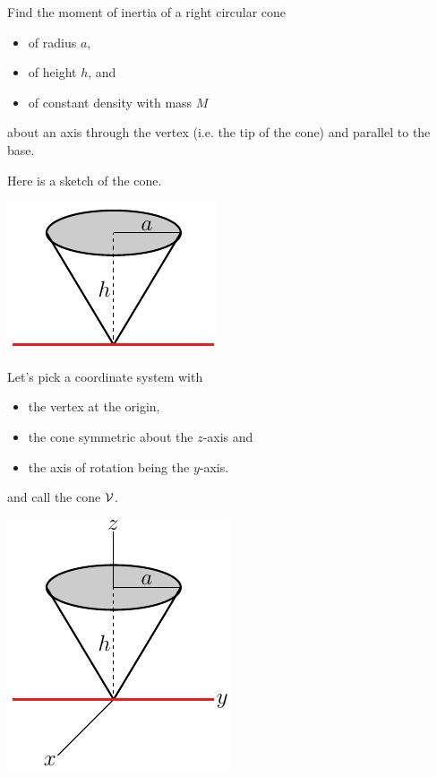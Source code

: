 \begin{eg}\label{eg moment cone}
Find the moment of inertia of a right circular cone 
\begin{itemize}\itemsep1pt \parskip0pt 
\item 
of radius $a$,
\item 
of height $h$, and
\item
of constant density with mass $M$
\end{itemize}
about an axis through the vertex (i.e. the tip of the cone)
and parallel to the base.

\soln
Here is a sketch of the cone.
\begin{efig}
\begin{center}
    \includegraphics{cone}
\end{center}
\end{efig}
Let's pick a coordinate system with 
\begin{itemize}\itemsep1pt \parskip0pt 
\item 
the vertex at the origin,
\item 
the cone symmetric about the $z$-axis and
\item
the axis of rotation being the $y$-axis.
\end{itemize}
and call the cone $\mathcal{V}$.

\begin{efig}
\begin{center}
    \includegraphics{coneZ}
\end{center}
\end{efig}


\end{eg}
